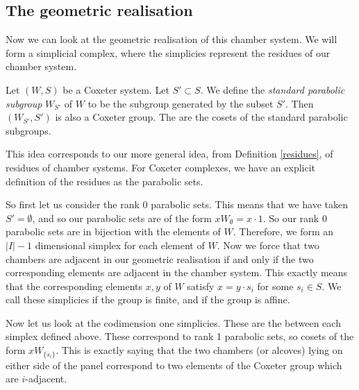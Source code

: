 \documentclass[11pt]{article}
\begin{document}
\subsection{The geometric realisation}
Now we can look at the geometric realisation of this chamber system. We will form a simplicial complex, where the simplicies represent the residues of our chamber system. 



\begin{definition}
    Let $(W,S)$ be a Coxeter system. Let $S'\subset S$. We define the \textit{standard parabolic subgroup} $W_{S'}$ of $W$ to be the subgroup generated by the subset $S'$. Then $(W_{S'},S')$ is also a Coxeter group. The  are the cosets of the standard parabolic subgroups. 
\end{definition}

This idea corresponds to our more general idea, from Definition \ref{residues}, of residues of chamber systems. For Coxeter complexes, we have an explicit definition of the residues as the parabolic sets. 

So first let us consider the rank 0 parabolic sets. This means that we have taken $S'=\emptyset$, and so our parabolic sets are of the form $xW_\emptyset=x\cdot{1}$. So our rank 0 parabolic sets are in bijection with the elements of $W$. Therefore, we form an $|I| -1$ dimensional simplex for each element of $W$. Now we force that two chambers are adjacent in our geometric realisation if and only if the two corresponding elements are adjacent in the chamber system. This exactly means that the corresponding elements $x,y$ of $W$ satisfy $x=y\cdot s_i$ for some $s_i\in S$. We call these simplicies  if the group is finite, and  if the group is affine.

Now let us look at the codimension one simplicies. These are the  between each simplex defined above. These correspond to rank 1 parabolic sets, so cosets of the form $xW_{\{s_i\}}$. This is exactly saying that the two chambers (or alcoves) lying on either side of the panel correspond to two elements of the Coxeter group which are $i$-adjacent. 


\end{document}
